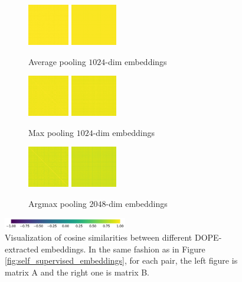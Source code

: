 \documentclass[final]{cvpr}
\begin{document}
\begin{figure}[t]
	\begin{subfigure}[t]{0.5\linewidth}
		\centering\captionsetup{width=.9\linewidth, justification=raggedright}
		\includegraphics[height=1.8cm]{fig/matrices/a_avg.png}
		\includegraphics[height=1.8cm]{fig/matrices/b_avg.png}
		\caption{\centering Average pooling $1024$-dim embeddings}
	\end{subfigure}\hfill
	\begin{subfigure}[t]{0.5\linewidth}
		\centering\captionsetup{width=.9\linewidth, justification=raggedright}
		\includegraphics[height=1.8cm]{fig/matrices/a_max.png}
		\includegraphics[height=1.8cm]{fig/matrices/b_max.png}
		\caption{\centering Max pooling $1024$-dim embeddings}
	\end{subfigure}
	\par\medskip
	\centering
	\begin{subfigure}[t]{0.5\linewidth}
		\captionsetup{width=.9\linewidth, justification=raggedright}
		\includegraphics[height=1.8cm]{fig/matrices/a_amax.png}
		\includegraphics[height=1.8cm]{fig/matrices/b_amax.png}
		\caption{\centering Argmax pooling $2048$-dim embeddings}
	\end{subfigure}\hfill
	\par\medskip
	\centering
	\includegraphics[width=0.48\textwidth]{fig/colorbar}
	\caption{Visualization of cosine similarities between different DOPE-extracted embeddings. In the same fashion as in Figure \ref*{fig:self_supervised_embeddings}, for each pair, the left figure is matrix A and the right one is matrix B.}
	\label{fig:DOPE_embeddings}
\end{figure}
\end{document}
